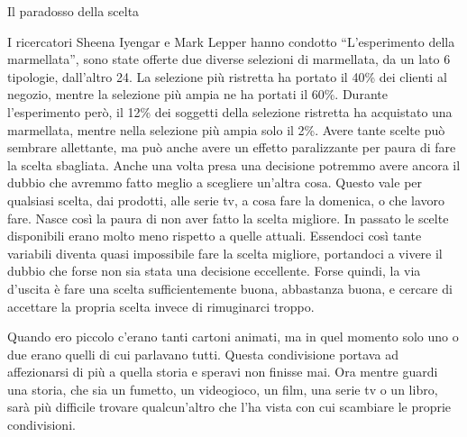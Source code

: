 \documentclass[12pt]{book} %
\begin{document}
\begin{mdframed}[linewidth=1pt]
Il paradosso della scelta

I ricercatori Sheena Iyengar e Mark Lepper hanno condotto “L'esperimento della marmellata”, sono
state offerte due diverse selezioni di marmellata, da un lato 6 tipologie, dall'altro 24. La
selezione più ristretta ha portato il 40\% dei clienti al negozio, mentre la selezione più ampia ne ha portati il 60\%.
Durante l'esperimento però, il 12\% dei soggetti della selezione ristretta ha acquistato una
marmellata, mentre nella selezione più ampia solo il 2\%. Avere tante scelte può sembrare allettante, ma può anche
avere un effetto paralizzante per paura di fare la scelta sbagliata. Anche una volta presa una decisione potremmo avere ancora
il dubbio che avremmo fatto meglio a scegliere un'altra cosa. Questo vale per qualsiasi scelta, dai prodotti, alle
serie tv, a cosa fare la domenica, o che lavoro fare. Nasce così la paura di non aver
fatto la scelta migliore. In passato le scelte disponibili erano molto meno rispetto a quelle attuali. Essendoci così
tante variabili diventa quasi impossibile fare la scelta migliore, portandoci a vivere il dubbio che forse non sia
stata una decisione eccellente. Forse quindi, la via d'uscita è fare una scelta sufficientemente
buona, abbastanza buona, e cercare di accettare la propria scelta invece di rimuginarci troppo.

Quando ero piccolo c'erano tanti cartoni animati, ma in quel momento solo uno o due erano quelli di cui parlavano tutti. Questa condivisione portava ad affezionarsi di più a quella storia e speravi non finisse mai. Ora mentre guardi una storia, che sia un fumetto, un videogioco, un film, una serie tv o un libro, sarà più difficile trovare qualcun'altro che l'ha vista con cui scambiare le proprie condivisioni.
\end{mdframed}
\end{document}
